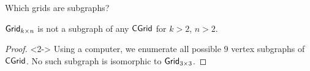\begin{frame}{Which grids are subgraphs?}

\begin{theorem}
$\textsf{Grid}_{k \times n}$ is not a subgraph of any  $\textsf{CGrid}$ for $k > 2$, $n > 2$.
\end{theorem}

\begin{proof}<2->
Using a computer, we enumerate all possible $9$ vertex subgraphs of $\textsf{CGrid}$. No such subgraph is isomorphic to $\textsf{Grid}_{3 \times 3}$.
\end{proof}

\end{frame}